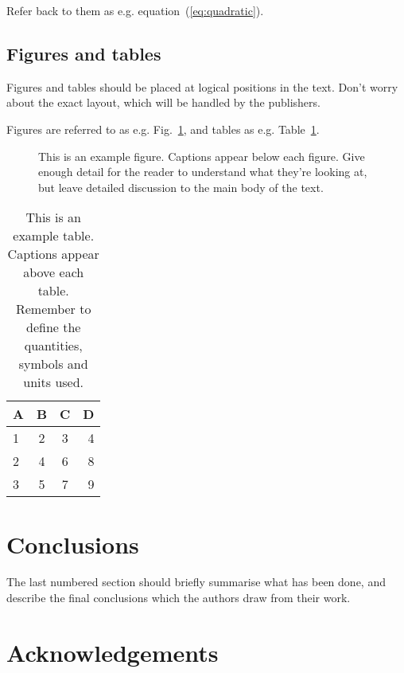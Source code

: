 \documentclass[a4paper,fleqn,usenatbib]{mnras}
\begin{document}
Refer back to them as e.g. equation~(\ref{eq:quadratic}).

\subsection{Figures and tables}

Figures and tables should be placed at logical positions in the text. Don't
worry about the exact layout, which will be handled by the publishers.

Figures are referred to as e.g. Fig.~\ref{fig:example_figure}, and tables as
e.g. Table~\ref{tab:example_table}.

\begin{figure}
    \caption{This is an example figure. Captions appear below each figure.
	Give enough detail for the reader to understand what they're looking at,
	but leave detailed discussion to the main body of the text.}
    \label{fig:example_figure}
\end{figure}

\begin{table}
	\centering
	\caption{This is an example table. Captions appear above each table.
	Remember to define the quantities, symbols and units used.}
	\label{tab:example_table}
	\begin{tabular}{lccr} %
		\hline
		A & B & C & D\\
		\hline
		1 & 2 & 3 & 4\\
		2 & 4 & 6 & 8\\
		3 & 5 & 7 & 9\\
		\hline
	\end{tabular}
\end{table}


\section{Conclusions}

The last numbered section should briefly summarise what has been done, and describe
the final conclusions which the authors draw from their work.

\section*{Acknowledgements}
\end{document}
